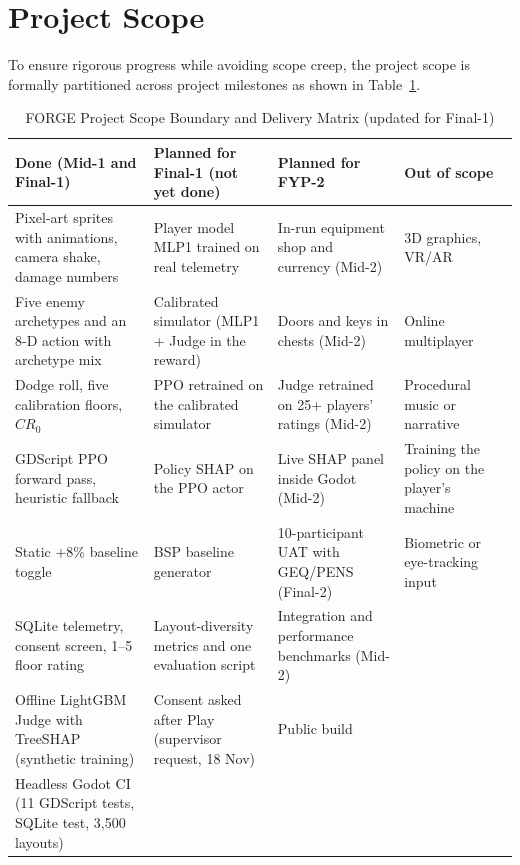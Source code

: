 \section{Project Scope}\label{sec:scope}
To ensure rigorous progress while avoiding scope creep, the project scope is formally partitioned across project milestones as shown in Table~\ref{tab:scope_matrix}.

\begin{table}[!htbp]
\centering
\caption{FORGE Project Scope Boundary and Delivery Matrix (updated for Final-1)}
\label{tab:scope_matrix}
\scriptsize
\begin{tabular}{p{}p{}p{}p{}}
\toprule
\textbf{Done (Mid-1 and Final-1)} & \textbf{Planned for Final-1 (not yet done)} & \textbf{Planned for FYP-2} & \textbf{Out of scope} \\
\midrule
Pixel-art sprites with animations, camera shake, damage numbers & Player model MLP1 trained on real telemetry & In-run equipment shop and currency (Mid-2) & 3D graphics, VR/AR \\
Five enemy archetypes and an 8-D action with archetype mix & Calibrated simulator (MLP1 + Judge in the reward) & Doors and keys in chests (Mid-2) & Online multiplayer \\
Dodge roll, five calibration floors, $CR_0$ & PPO retrained on the calibrated simulator & Judge retrained on 25+ players' ratings (Mid-2) & Procedural music or narrative \\
GDScript PPO forward pass, heuristic fallback & Policy SHAP on the PPO actor & Live SHAP panel inside Godot (Mid-2) & Training the policy on the player's machine \\
Static $+8\%$ baseline toggle & BSP baseline generator & 10-participant UAT with GEQ/PENS (Final-2) & Biometric or eye-tracking input \\
SQLite telemetry, consent screen, 1--5 floor rating & Layout-diversity metrics and one evaluation script & Integration and performance benchmarks (Mid-2) & \\
Offline LightGBM Judge with TreeSHAP (synthetic training) & Consent asked after Play (supervisor request, 18 Nov) & Public build & \\
Headless Godot CI (11 GDScript tests, SQLite test, 3,500 layouts) & & & \\
\bottomrule
\end{tabular}
\end{table}



